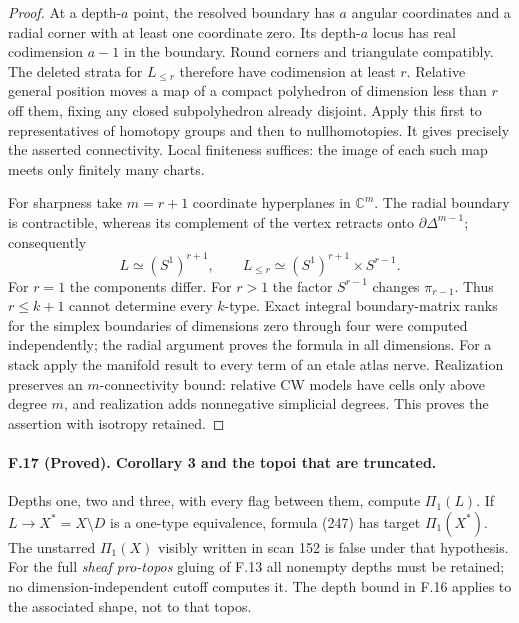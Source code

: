 \begin{proof}
At a depth-$a$ point, the resolved boundary has $a$ angular coordinates
and a radial corner with at least one coordinate zero. Its depth-$a$
locus has real codimension $a-1$ in the boundary. Round corners and
triangulate compatibly. The deleted strata for $L_{\leq r}$ therefore
have codimension at least $r$. Relative general position moves a map
of a compact polyhedron of dimension less than $r$ off them, fixing
any closed subpolyhedron already disjoint. Apply this first to
representatives of homotopy groups and then to nullhomotopies. It
gives precisely the asserted connectivity. Local finiteness suffices:
the image of each such map meets only finitely many charts.

For sharpness take $m=r+1$ coordinate hyperplanes in $\mathbb C^m$.
The radial boundary is contractible, whereas its complement of the
vertex retracts onto $\partial\Delta^{m-1}$; consequently
\[
 L\simeq(S^1)^{r+1},\qquad
 L_{\leq r}\simeq(S^1)^{r+1}\times S^{r-1}.
\]
For $r=1$ the components differ. For $r>1$ the factor $S^{r-1}$
changes $\pi_{r-1}$. Thus $r\leq k+1$ cannot determine every $k$-type.
Exact integral boundary-matrix ranks for the simplex boundaries of
dimensions zero through four were computed independently; the radial
argument proves the formula in all dimensions. For a stack apply the
manifold result to every term of an etale atlas nerve. Realization
preserves an $m$-connectivity bound: relative CW models have cells only
above degree $m$, and realization adds nonnegative simplicial degrees.
This proves the assertion with isotropy retained.
\end{proof}

\paragraph{F.17 (Proved). Corollary 3
and the topoi that are truncated.}
Depths one, two and three, with every flag between them, compute
$\Pi_1(L)$. If $L\to X^*=X\setminus D$ is a one-type equivalence,
formula (247) has target $\Pi_1(X^*)$. The unstarred $\Pi_1(X)$ visibly
written in scan 152 is false under that hypothesis. For the full
\emph{sheaf pro-topos} gluing of F.13 all nonempty depths must be
retained; no dimension-independent cutoff computes it. The depth
bound in F.16 applies to the associated shape, not to that topos.

